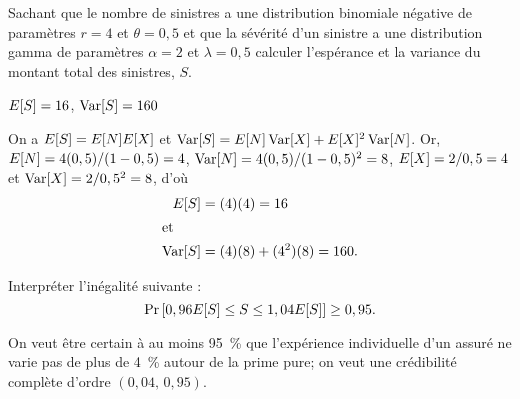\begin{exercice}
  Sachant que le nombre de sinistres a une distribution binomiale
  négative de paramètres $r = 4$ et $\theta = 0,5$ et que la sévérité
  d'un sinistre a une distribution gamma de paramètres $\alpha = 2$ et
  $\lambda = 0,5$ calculer l'espérance et la variance du montant total
  des sinistres, $S$.
  \begin{rep}
    $E [ S ] = 16$, $\operatorname{Var} [ S ] = 160$
  \end{rep}
  \begin{sol}
    On a $E [ S ] = E [ N ]E [ X ]$ et $\operatorname{Var} [ S ] = E [ N ]\operatorname{Var} [ X ] +
    E [ X ]^2\operatorname{Var} [ N ]$. Or, $E [ N ] = 4 (0,5)/(1 - 0,5) = 4$, $\operatorname{Var} [ N ]
    = 4 (0,5)/(1 - 0,5)^2 = 8$, $E [ X ] = 2/0,5 = 4$ et $\operatorname{Var} [ X ] =
    2/0,5^2 = 8$, d'où
    \begin{align*}
        E [ S ]
        &= (4)(4)
         = 16 \\
        \intertext{et}
        \operatorname{Var} [ S ]
        &= (4)(8) + (4^2)(8)
         = 160.
    \end{align*}
  \end{sol}
\end{exercice}

\begin{exercice}
  Interpréter l'inégalité suivante :
  \begin{displaymath}
    \Pr
    \left[
      0,96 E [ S ] \leq S \leq 1,04 E [ S ]
    \right]
    \geq 0,95.
  \end{displaymath}
  \begin{rep}
    On veut être certain à au moins 95~\% que l'expérience
    individuelle d'un assuré ne varie pas de plus de 4~\% autour de la
    prime pure; on veut une crédibilité complète d'ordre $(0,04,\,
    0,95)$.
  \end{rep}
\end{exercice}

